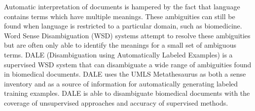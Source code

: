 Automatic interpretation of documents is hampered by the fact that language contains terms which have multiple meanings. These ambiguities can still be
 found when language is restricted to a particular domain, such as biomedicine.
 Word Sense Disambiguation (WSD) systems attempt to resolve these ambiguities
 but are often only able to identify the meanings for a small set of ambiguous
 terms. DALE (Disambiguation using Automatically Labeled Examples) is a
 supervised WSD system that can disambiguate a wide range of ambiguities found
 in biomedical documents. DALE uses the UMLS Metathesaurus as both a sense
 inventory and as a source of information for automatically generating labeled
 training examples. DALE is able to disambiguate biomedical documents with the
 coverage of unsupervised approaches and accuracy of supervised methods.


